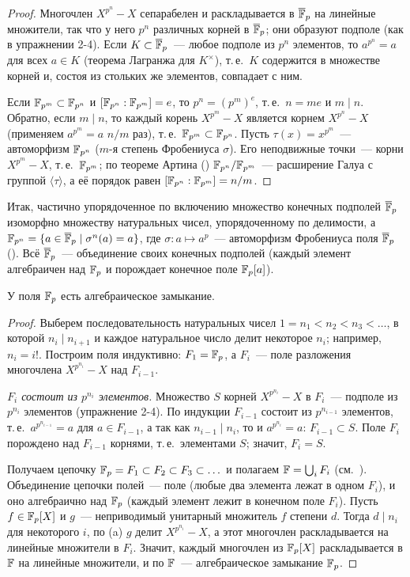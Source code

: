 \begin{proof}
Многочлен $X^{p^n}-X$ сепарабелен и раскладывается в $\overline{\mathbb F}_p$ на линейные множители, так что у него $p^n$ различных корней в
$\overline{\mathbb F}_p$; они образуют подполе (как в упражнении 2-4). Если $K\subset\overline{\mathbb F}_p$~--- любое подполе из $p^n$ элементов, то
$a^{p^n}=a$ для всех $a\in K$ (теорема Лагранжа для $K^\times$), т.\,е.\ $K$ содержится в множестве корней и, состоя из
стольких же элементов, совпадает с ним.

Если $\mathbb F_{p^m}\subset\mathbb F_{p^n}$ и $[\mathbb F_{p^n}:\mathbb F_{p^m}]=e$, то $p^n=(p^m)^e$, т.\,е.\ $n=me$ и $m\mid n$. Обратно, если $m\mid n$, то
каждый корень $X^{p^m}-X$ является корнем $X^{p^n}-X$ (применяем $a^{p^m}=a$ $n/m$ раз), т.\,е.\ $\mathbb F_{p^m}\subset\mathbb F_{p^n}$.
Пусть $\tau(x)=x^{p^m}$~--- автоморфизм $\mathbb F_{p^n}$ ($m$-я степень Фробениуса $\sigma$). Его неподвижные точки~--- корни $X^{p^m}-X$, т.\,е.\
$\mathbb F_{p^m}$; по теореме Артина () $\mathbb F_{p^n}/\mathbb F_{p^m}$~--- расширение Галуа с группой $\langle\tau\rangle$, а её порядок равен
$[\mathbb F_{p^n}:\mathbb F_{p^m}]=n/m$.
\end{proof}

Итак, частично упорядоченное по включению множество конечных подполей $\overline{\mathbb F}_p$ изоморфно множеству натуральных чисел,
упорядоченному по делимости, а $\mathbb F_{p^n}=\{a\in\overline{\mathbb F}_p\mid\sigma^n(a)=a\}$, где $\sigma\colon a\mapsto a^p$~--- автоморфизм Фробениуса
поля $\overline{\mathbb F}_p$ (\rf{1.4}). Всё $\overline{\mathbb F}_p$~--- объединение своих конечных подполей (каждый элемент алгебраичен над $\mathbb F_p$ и порождает
конечное поле $\mathbb F_p[a]$).

\begin{proposition}[4.24]
У поля $\mathbb F_p$ есть алгебраическое замыкание.
\end{proposition}

\begin{proof}
Выберем последовательность натуральных чисел $1=n_1<n_2<n_3<\dots$, в которой $n_i\mid n_{i+1}$ и каждое натуральное
число делит некоторое $n_i$; например, $n_i=i!$. Построим поля индуктивно: $F_1=\mathbb F_p$, а $F_i$~--- поле разложения
многочлена $X^{p^{n_i}}-X$ над $F_{i-1}$.

\emph{$F_i$ состоит из $p^{n_i}$ элементов.} Множество $S$ корней $X^{p^{n_i}}-X$ в $F_i$~--- подполе из $p^{n_i}$ элементов
(упражнение 2-4). По индукции $F_{i-1}$ состоит из $p^{n_{i-1}}$ элементов, т.\,е.\ $a^{p^{n_{i-1}}}=a$ для $a\in F_{i-1}$, а так
как $n_{i-1}\mid n_i$, то и $a^{p^{n_i}}=a$: $F_{i-1}\subset S$. Поле $F_i$ порождено над $F_{i-1}$ корнями, т.\,е.\ элементами
$S$; значит, $F_i=S$.

Получаем цепочку $\mathbb F_p=F_1\subset F_2\subset F_3\subset\dots$ и полагаем $\mathbb F=\bigcup_iF_i$ (см.\ ). Объединение цепочки полей~--- поле
(любые два элемента лежат в одном $F_i$), и оно алгебраично над $\mathbb F_p$ (каждый элемент лежит в конечном поле $F_i$).
Пусть $f\in\mathbb F_p[X]$ и $g$~--- неприводимый унитарный множитель $f$ степени $d$. Тогда $d\mid n_i$ для некоторого $i$, по
\rf{4.22}(a) $g$ делит $X^{p^{n_i}}-X$, а этот многочлен раскладывается на линейные множители в $F_i$. Значит, каждый
многочлен из $\mathbb F_p[X]$ раскладывается в $\mathbb F$ на линейные множители, и по \rf{1.45} $\mathbb F$~--- алгебраическое замыкание $\mathbb F_p$.
\end{proof}

